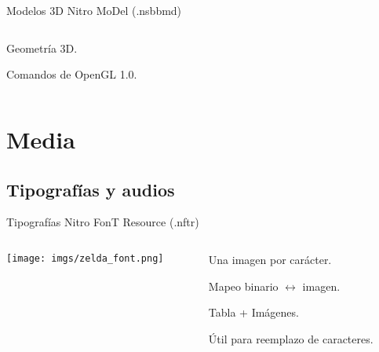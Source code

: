 \begin{frame}{Modelos 3D}
    \centering{}Nitro MoDel (.nsbbmd) \\ \vspace{5pt}
    \begin{columns}
    \begin{column}{0.5\textwidth}
        \begin{wideitemize}
            \item<1-> Geometría 3D.
            \item<2-> Comandos de OpenGL 1.0.
        \end{wideitemize}
    \end{column}
    \begin{column}{0.6\textwidth}
    \end{column}
    \end{columns}
\end{frame}

\section{Media}
\subsection{Tipografías y audios}
\begin{frame}{Tipografías}
    \centering{}Nitro FonT Resource (.nftr) \\ \vspace{5pt}
    \begin{columns}
    \begin{column}{0.5\textwidth}
        \texttt{[image: imgs/zelda\_font.png]}
    \end{column}
    \begin{column}{0.6\textwidth}
        \begin{wideitemize}
            \item<+-> Una imagen por carácter.
            \item<+-> Mapeo binario $\leftrightarrow$ imagen.
            \item<+-> Tabla + Imágenes.
            \item<+-> Útil para reemplazo de caracteres.
        \end{wideitemize}
    \end{column}
    \end{columns}
\end{frame}

